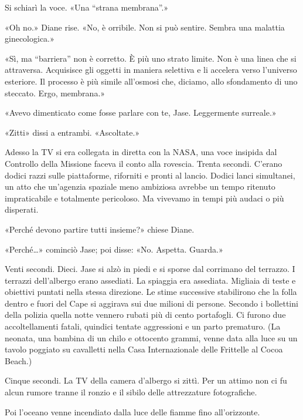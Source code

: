 Si schiarì la voce. «Una ``strana membrana''.»

«Oh no.» Diane rise. «No, è orribile. Non si può sentire. Sembra una
malattia ginecologica.»

«Sì, ma ``barriera'' non è corretto. È più uno strato limite. Non è una
linea che si attraversa. Acquisisce gli oggetti in maniera selettiva e
li accelera verso l'universo esteriore. Il processo è più simile
all'osmosi che, diciamo, allo sfondamento di uno steccato. Ergo,
membrana.»

«Avevo dimenticato come fosse parlare con te, Jase. Leggermente
surreale.»

«Zitti» dissi a entrambi. «Ascoltate.»

Adesso la TV si era collegata in diretta con la NASA, una voce insipida
dal Controllo della Missione faceva il conto alla rovescia. Trenta
secondi. C'erano dodici razzi sulle piattaforme, riforniti e pronti al
lancio. Dodici lanci simultanei, un atto che un'agenzia spaziale meno
ambiziosa avrebbe un tempo ritenuto impraticabile e totalmente
pericoloso. Ma vivevamo in tempi più audaci o più disperati.

«Perché devono partire tutti insieme?» chiese Diane.

«Perché\ldots» cominciò Jase; poi disse: «No. Aspetta. Guarda.»

Venti secondi. Dieci. Jase si alzò in piedi e si sporse dal corrimano
del terrazzo. I terrazzi dell'albergo erano assediati. La spiaggia era
assediata. Migliaia di teste e obiettivi puntati nella stessa direzione.
Le stime successive stabilirono che la folla dentro e fuori del Cape si
aggirava sui due milioni di persone. Secondo i bollettini della polizia
quella notte vennero rubati più di cento portafogli. Ci furono due
accoltellamenti fatali, quindici tentate aggressioni e un parto
prematuro. (La neonata, una bambina di un chilo e ottocento grammi,
venne data alla luce su un tavolo poggiato su cavalletti nella Casa
Internazionale delle Frittelle al Cocoa Beach.)

Cinque secondi. La TV della camera d'albergo si zittì. Per un attimo non
ci fu alcun rumore tranne il ronzio e il sibilo delle attrezzature
fotografiche.

Poi l'oceano venne incendiato dalla luce delle fiamme fino
all'orizzonte.

